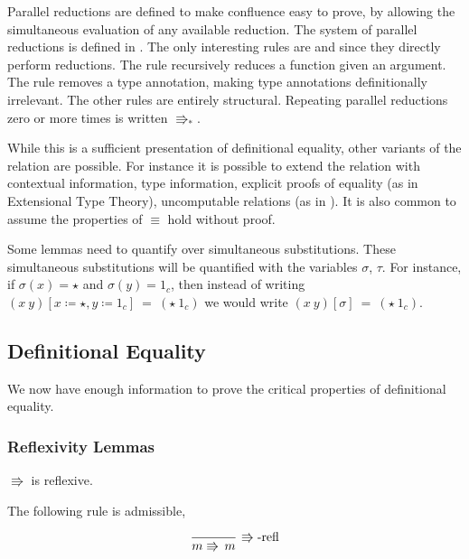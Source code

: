  Parallel reductions are defined to make confluence easy to prove, by allowing the simultaneous evaluation of any available reduction.
The system of parallel reductions is defined in .
The only interesting rules are  and  since they directly perform reductions.
The  rule recursively reduces a function given an argument.
The  rule removes a type annotation, making type annotations definitionally irrelevant.
The other rules are entirely structural.
Repeating parallel reductions zero or more times is written $\Rrightarrow_{\ast}$.
 
While this is a sufficient presentation of definitional equality, other variants of the relation are possible.
For instance it is possible to extend the relation with contextual information, type information, explicit proofs of equality (as in Extensional Type Theory), uncomputable relations (as in \cite{jia2010dependent}).
It is also common to assume the properties of $\equiv$ hold without proof.
 
Some lemmas need to quantify over simultaneous substitutions.
These simultaneous substitutions will be quantified with the variables $\sigma$, $\tau$.
For instance, if $\sigma(x) = \star$ and $\sigma(y) = 1_c$, then instead of writing $(x\ y)[x \coloneqq \star,y \coloneqq 1_c]\ =\ (\star\ 1_c)$ we would write $(x\ y)[\sigma]\ =\ (\star\ 1_c)$.
 
 
\subsection{Definitional Equality}
 
We now have enough information to prove the critical properties of definitional equality.
 
\subsubsection{Reflexivity Lemmas}
\begin{lem}
$\Rrightarrow$ is reflexive.
 
The following rule is admissible,
 
\[
\frac{\,}{m\Rrightarrow\,m}\,\operatorname{\Rrightarrow-refl}
\]
\end{lem}
 
